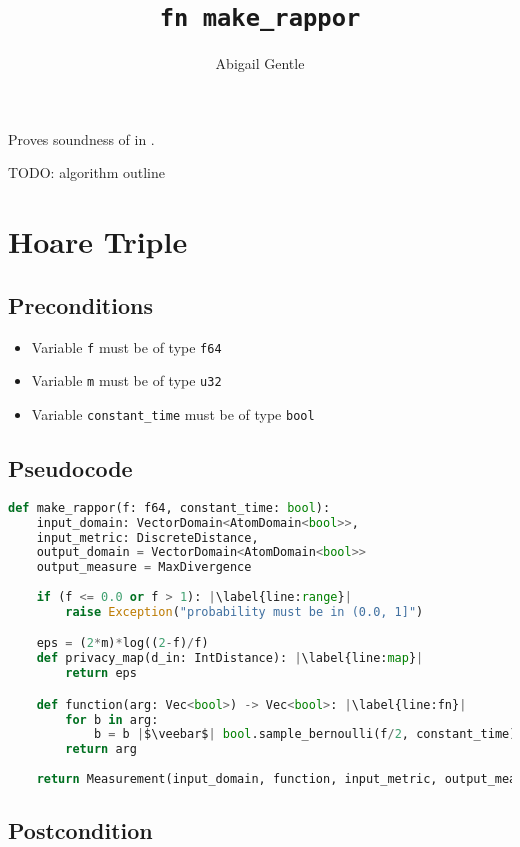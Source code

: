 \documentclass{article}
\title{\texttt{fn make\_rappor}}
\author{Abigail Gentle}
\begin{document}
\maketitle



\contrib

Proves soundness of  in .

TODO: algorithm outline
\section{Hoare Triple}
\subsection{Preconditions}
\begin{itemize}
	\item Variable \texttt{f} must be of type \texttt{f64}
	\item Variable \texttt{m} must be of type \texttt{u32} 
    \item Variable \texttt{constant\_time} must be of type \texttt{bool}
\end{itemize}

\subsection*{Pseudocode}
\begin{lstlisting}[language=Python, escapechar=|]
def make_rappor(f: f64, constant_time: bool):
    input_domain: VectorDomain<AtomDomain<bool>>,
    input_metric: DiscreteDistance,
    output_domain = VectorDomain<AtomDomain<bool>>
    output_measure = MaxDivergence
    
    if (f <= 0.0 or f > 1): |\label{line:range}|
        raise Exception("probability must be in (0.0, 1]")

    eps = (2*m)*log((2-f)/f)
    def privacy_map(d_in: IntDistance): |\label{line:map}|
        return eps

    def function(arg: Vec<bool>) -> Vec<bool>: |\label{line:fn}|
        for b in arg:
        	b = b |$\veebar$| bool.sample_bernoulli(f/2, constant_time)
        return arg
    
    return Measurement(input_domain, function, input_metric, output_measure, privacy_map)
\end{lstlisting}

\subsection*{Postcondition}
\end{document}
